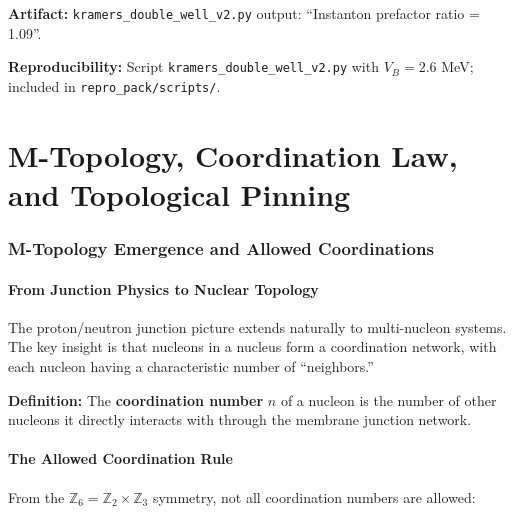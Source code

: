 \documentclass[11pt,a4paper]{article}
\begin{document}
\textbf{Artifact:} \texttt{kramers\_double\_well\_v2.py} output: ``Instanton prefactor ratio = 1.09''.

\textbf{Reproducibility:} Script \texttt{kramers\_double\_well\_v2.py} with $V_B = 2.6$ MeV; included in \texttt{repro\_pack/scripts/}.

\clearpage


\part{M-Topology, Coordination Law, and Topological Pinning}

\section{M-Topology Emergence and Allowed Coordinations}
\label{sec:M_topology}

\subsection{From Junction Physics to Nuclear Topology}

The proton/neutron junction picture extends naturally to multi-nucleon systems. The key insight is that nucleons in a nucleus form a coordination network, with each nucleon having a characteristic number of ``neighbors.''

\textbf{Definition:} The \textbf{coordination number} $n$ of a nucleon is the number of other nucleons it directly interacts with through the membrane junction network.

\subsection{The Allowed Coordination Rule}

From the $\mathbb{Z}_6 = \mathbb{Z}_2 \times \mathbb{Z}_3$ symmetry, not all coordination numbers are allowed:
\end{document}
